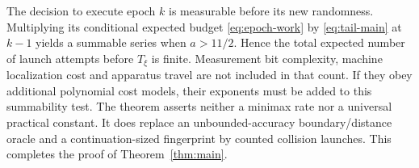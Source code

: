 The decision to execute epoch $k$ is measurable before its new randomness.
Multiplying its conditional expected budget \eqref{eq:epoch-work} by
\eqref{eq:tail-main} at $k-1$ yields a summable series when $a>11/2$.
Hence the total expected number of launch attempts before $T_\xi$ is
finite. Measurement bit complexity, machine localization cost and apparatus
travel are not included in that count. If they obey additional polynomial
cost models, their exponents must be added to this summability test.
The theorem asserts neither a minimax rate nor a universal practical
constant. It does replace an unbounded-accuracy boundary/distance oracle
and a continuation-sized fingerprint by counted collision launches.
This completes the proof of Theorem~\ref{thm:main}.
